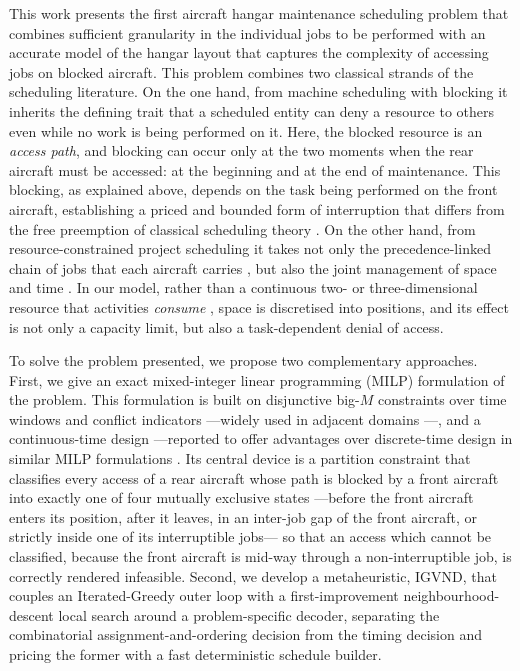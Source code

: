 This work presents the first aircraft hangar maintenance scheduling problem that combines sufficient granularity in the individual jobs to be performed with an accurate model of the hangar layout that captures the complexity of accessing jobs on blocked aircraft. This problem combines two classical strands of the scheduling literature. On the one hand, from machine scheduling with blocking \citep{HallSriskandarajah1996,MascisPacciarelli2002} it inherits the defining trait that a scheduled entity can deny a resource to others even while no work is being performed on it. Here, the blocked resource is an \emph{access path}, and blocking can occur only at the two moments when the rear aircraft must be accessed: at the beginning and at the end of maintenance. This blocking, as explained above, depends on the task being performed on the front aircraft, establishing a priced and bounded form of interruption that differs from the free preemption of classical scheduling theory \citep{Pinedo2016}. On the other hand, from resource-constrained project scheduling it takes not only the precedence-linked chain of jobs that each aircraft carries \citep{Blazewicz1983}, but also the joint management of space and time \citep{Lee1997}. In our model, rather than a continuous two- or three-dimensional resource that activities \emph{consume} \citep{Zhang2024}, space is discretised into positions, and its effect is not only a capacity limit, but also a task-dependent denial of access.

To solve the problem presented, we propose two complementary approaches. First, we give an exact mixed-integer linear programming (MILP) formulation of the problem. This formulation is built on disjunctive big-$M$ constraints over time windows and conflict indicators ---widely used in adjacent domains \citep{Mao2018, Chen2019, Lee2024, Baya2022}---, and a continuous-time design ---reported to offer advantages over discrete-time design in similar MILP formulations \citep{MunozDiaz2025}. Its central device is a partition constraint that classifies every access of a rear aircraft whose path is blocked by a front aircraft into exactly one of four mutually exclusive states ---before the front aircraft enters its position, after it leaves, in an inter-job gap of the front aircraft, or strictly inside one of its interruptible jobs--- so that an access which cannot be classified, because the front aircraft is mid-way through a non-interruptible job, is correctly rendered infeasible. Second, we develop a metaheuristic, \textsc{IGVND}, that couples an Iterated-Greedy outer loop with a first-improvement neighbourhood-descent local search around a problem-specific decoder, separating the combinatorial assignment-and-ordering decision from the timing decision and pricing the former with a fast deterministic schedule builder.

